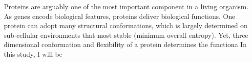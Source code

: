 Proteins are arguably one of the most important component in a living organism. As genes encode biological features, proteins deliver biological functions. One protein can adopt many structural conformations, which is largely determined on sub-cellular environments that most stable (minimum overall entropy). Yet, three dimensional conformation and flexibility of a protein determines the functiona   In this study, I will be 